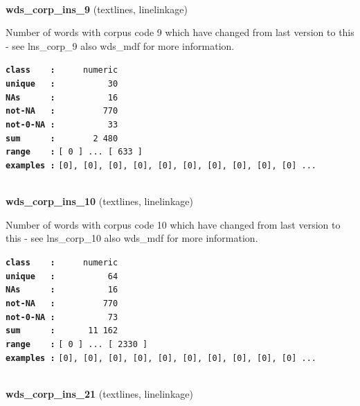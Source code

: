 \documentclass[]{article}
\begin{document}
~

\textbf{wds\_corp\_ins\_9} (textlines, linelinkage)

Number of words with corpus code 9 which have changed from last version
to this - see lns\_corp\_9 also wds\_mdf for more information.

\textbf{\texttt{class\ \ \ \ :}} \texttt{~~~~~numeric}\\
\textbf{\texttt{unique\ \ \ :}} \texttt{~~~~~~~~~~30}\\
\textbf{\texttt{NAs\ \ \ \ \ \ :}} \texttt{~~~~~~~~~~16}\\
\textbf{\texttt{not-NA\ \ \ :}} \texttt{~~~~~~~~~770}\\
\textbf{\texttt{not-0-NA\ :}} \texttt{~~~~~~~~~~33}\\
\textbf{\texttt{sum\ \ \ \ \ \ :}} \texttt{~~~~~~~2~480}\\
\textbf{\texttt{range\ \ \ \ :}}
\texttt{{[}\ 0\ {]}\ ...\ {[}\ 633\ {]}}\\
\textbf{\texttt{examples\ :}}
\texttt{{[}0{]},\ {[}0{]},\ {[}0{]},\ {[}0{]},\ {[}0{]},\ {[}0{]},\ {[}0{]},\ {[}0{]},\ {[}0{]},\ {[}0{]}\ ...}\\

~

\textbf{wds\_corp\_ins\_10} (textlines, linelinkage)

Number of words with corpus code 10 which have changed from last version
to this - see lns\_corp\_10 also wds\_mdf for more information.

\textbf{\texttt{class\ \ \ \ :}} \texttt{~~~~~numeric}\\
\textbf{\texttt{unique\ \ \ :}} \texttt{~~~~~~~~~~64}\\
\textbf{\texttt{NAs\ \ \ \ \ \ :}} \texttt{~~~~~~~~~~16}\\
\textbf{\texttt{not-NA\ \ \ :}} \texttt{~~~~~~~~~770}\\
\textbf{\texttt{not-0-NA\ :}} \texttt{~~~~~~~~~~73}\\
\textbf{\texttt{sum\ \ \ \ \ \ :}} \texttt{~~~~~~11~162}\\
\textbf{\texttt{range\ \ \ \ :}}
\texttt{{[}\ 0\ {]}\ ...\ {[}\ 2330\ {]}}\\
\textbf{\texttt{examples\ :}}
\texttt{{[}0{]},\ {[}0{]},\ {[}0{]},\ {[}0{]},\ {[}0{]},\ {[}0{]},\ {[}0{]},\ {[}0{]},\ {[}0{]},\ {[}0{]}\ ...}\\

~

\textbf{wds\_corp\_ins\_21} (textlines, linelinkage)
\end{document}
